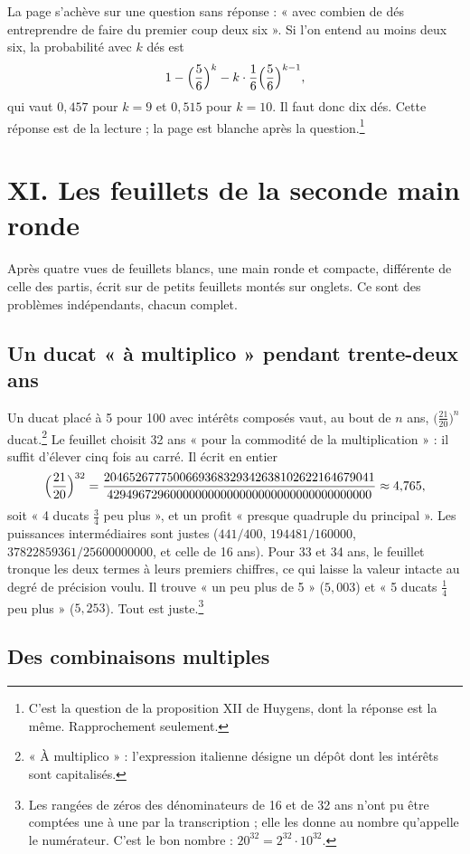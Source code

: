 \documentclass[11pt,a4paper]{article}
\begin{document}
La page s'achève sur une question sans réponse : « avec combien de dés
entreprendre de faire du premier coup deux six ». Si l'on entend au moins deux
six, la probabilité avec \(k\) dés est
\[
1-\Bigl(\frac56\Bigr)^k-k\cdot\frac16\Bigl(\frac56\Bigr)^{k-1},
\]
qui vaut \(0{,}457\) pour \(k=9\) et \(0{,}515\) pour \(k=10\). Il faut donc dix
dés. Cette réponse est de la lecture ; la page est blanche après la
question.\footnote{C'est la question de la proposition XII de Huygens, dont la
réponse est la même. Rapprochement seulement.}

\section*{XI. Les feuillets de la seconde main ronde}

Après quatre vues de feuillets blancs, une main ronde et compacte, différente de
celle des partis, écrit sur de petits feuillets montés sur onglets. Ce sont des
problèmes indépendants, chacun complet.

\subsection*{Un ducat « à multiplico » pendant trente-deux ans}

Un ducat placé à 5 pour 100 avec intérêts composés vaut, au bout de \(n\) ans,
\(\bigl(\frac{21}{20}\bigr)^n\) ducat.\footnote{« À multiplico » : l'expression
italienne désigne un dépôt dont les intérêts sont capitalisés.} Le feuillet
choisit 32 ans « pour la commodité de la multiplication » : il suffit d'élever
cinq fois au carré. Il écrit en entier
\[
\Bigl(\frac{21}{20}\Bigr)^{32}=\frac{2046526777500669368329342638102622164679041}{429496729600000000000000000000000000000000}\approx4{,}765,
\]
soit « 4 ducats \(\frac34\) peu plus », et un profit « presque quadruple du
principal ». Les puissances intermédiaires sont justes (\(441/400\),
\(194481/160000\), \(37822859361/25600000000\), et celle de 16 ans). Pour 33 et
34 ans, le feuillet tronque les deux termes à leurs premiers chiffres, ce qui
laisse la valeur intacte au degré de précision voulu. Il trouve « un peu plus
de 5 » (\(5{,}003\)) et « 5 ducats \(\frac14\) peu plus » (\(5{,}253\)). Tout est
juste.\footnote{Les rangées de zéros des dénominateurs de 16 et de 32 ans n'ont
pu être comptées une à une par la transcription ; elle les donne au nombre
qu'appelle le numérateur. C'est le bon nombre : \(20^{32}=2^{32}\cdot10^{32}\).}

\subsection*{Des combinaisons multiples}
\end{document}
